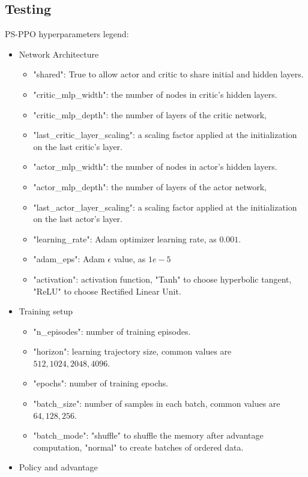 \documentclass[11pt, a4paper, hidelinks]{report}
\begin{document}
\subsection{Testing}\label{subsec:testing}

PS-PPO hyperparameters legend:
\begin{itemize}
	\item Network Architecture
	\begin{itemize}
		\item "shared": True to allow actor and critic to share initial and hidden layers.
		\item "critic\_mlp\_width": the number of nodes in critic's hidden layers.
		\item "critic\_mlp\_depth": the number of layers of the critic network,
		\item "last\_critic\_layer\_scaling": a scaling factor applied at the initialization on the last critic's layer.
		\item "actor\_mlp\_width": the number of nodes in actor's hidden layers.
		\item "actor\_mlp\_depth": the number of layers of the actor network,
		\item "last\_actor\_layer\_scaling": a scaling factor applied at the initialization on the last actor's layer.
		\item "learning\_rate": Adam optimizer learning rate, as $0.001$.
		\item "adam\_eps": Adam $\epsilon$ value, as $1e-5$
		\item "activation": activation function, "Tanh" to choose hyperbolic tangent, "ReLU" to choose Rectified Linear Unit.
	\end{itemize}
	\item Training setup
	\begin{itemize}
		\item "n\_episodes": number of training episodes.
		\item "horizon": learning trajectory size, common values are $512, 1024, 2048, 4096$.
		\item "epochs": number of training epochs.
		\item "batch\_size": number of samples in each batch, common values are $64, 128, 256$.
		\item "batch\_mode": "shuffle" to shuffle the memory after advantage computation, "normal" to create batches of ordered data.
	\end{itemize}
	\item Policy and advantage

\end{itemize}
\end{document}
